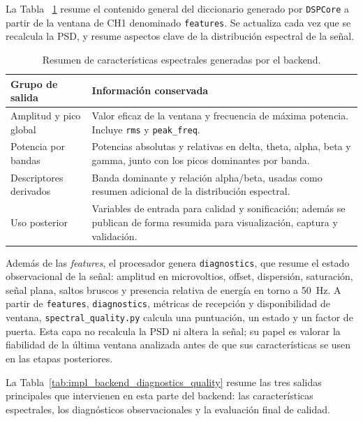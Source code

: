 \documentclass[../main.tex]{subfiles}
\begin{document}
La Tabla ~\ref{tab:impl_backend_features} resume el contenido general del diccionario generado por \texttt{DSPCore} a partir de la ventana de CH1 denominado \texttt{features}. Se actualiza cada vez que se recalcula la PSD, y resume aspectos clave de la distribución espectral de la señal.
\begin{table}[!htbp]
    \centering
    \caption{Resumen de características espectrales generadas por el backend.}
    \label{tab:impl_backend_features}
    \small
    \renewcommand{\arraystretch}{1.12}
    \begin{tabular}{p{}p{}}
        \hline
        \textbf{Grupo de salida} & \textbf{Información conservada} \\
        \hline
        Amplitud y pico global & Valor eficaz de la ventana y frecuencia de máxima potencia. Incluye \texttt{rms} y \texttt{peak\_freq}. \\
        Potencia por bandas & Potencias absolutas y relativas en delta, theta, alpha, beta y gamma, junto con los picos dominantes por banda. \\
        Descriptores derivados & Banda dominante y relación alpha/beta, usadas como resumen adicional de la distribución espectral. \\
        Uso posterior & Variables de entrada para calidad y sonificación; además se publican de forma resumida para visualización, captura y validación. \\
        \hline
    \end{tabular}
\end{table}



Además de las \textit{features}, el procesador genera \texttt{diagnostics}, que resume el estado observacional de la señal: amplitud en microvoltios, offset, dispersión, saturación, señal plana, saltos bruscos y presencia relativa de energía en torno a \SI{50}{\hertz}. A partir de \texttt{features}, \texttt{diagnostics}, métricas de recepción y disponibilidad de ventana, \texttt{spectral\_quality.py} calcula una puntuación, un estado y un factor de puerta. Esta capa no recalcula la PSD ni altera la señal; su papel es valorar la fiabilidad de la última ventana analizada antes de que sus características se usen en las etapas posteriores.

La Tabla~\ref{tab:impl_backend_diagnostics_quality} resume las tres salidas principales que intervienen en esta parte del backend: las características espectrales, los diagnósticos observacionales y la evaluación final de calidad.
\end{document}
